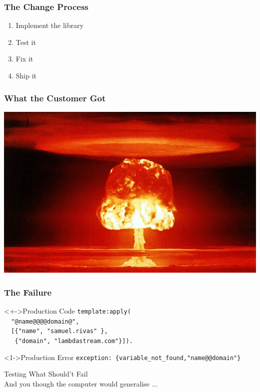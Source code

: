 \documentclass[xcolor=dvipsnames]{beamer}
\begin{document}
\begin{frame}
  \frametitle{The Change Process}
  \begin{enumerate}
  \item Implement the library
  \item Test it
  \item Fix it
  \item Ship it
  \end{enumerate}
\end{frame}

\begin{frame}
  \frametitle{What the Customer Got}
  \includegraphics[width=\textwidth]{images/nuclear}
\end{frame}

\begin{frame}[fragile]
  \frametitle{The Failure}

\begin{block}<+->{Production Code}
\texttt{template:apply(}\\
\texttt{~~"\alert<3>{\alert<2>{@name@}@@\alert<2>{@domain@}}",}\\
\texttt{~~[\{"\alert<2>{name}",   "samuel.rivas"    \},}\\
\texttt{~~~\{"\alert<2>{domain}", "lambdastream.com"\}]).}
\end{block}

\begin{alertblock}<1->{Production Error}
\texttt{exception: \{variable\_not\_found,"\alert<3>{name@@domain}"\}}
\end{alertblock}
\end{frame}

\begin{frame}
  \begin{center}
    {\huge Testing What Should't Fail}\\
    \vspace{1cm}
    And you though the computer would generalise ...
  \end{center}
\end{frame}
\end{document}
